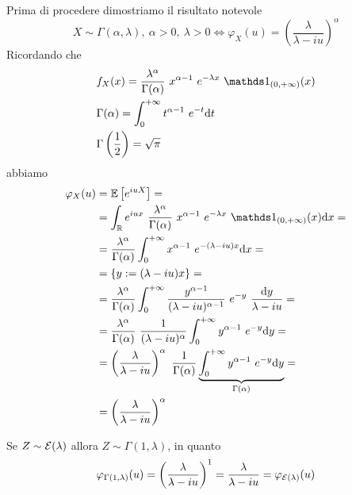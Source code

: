 \Soluzione{} %
Prima di procedere dimostriamo il risultato notevole
\[
X\sim\Gamma(\alpha,\lambda),\ \alpha>0,\ \lambda>0\iff\varphi_X(u)=\left( \frac{\lambda}{\lambda-iu} \right)^\alpha
\]
Ricordando che
\begin{gather*}
\begin{aligned}
&f_X(x)=\frac{\lambda^\alpha}{\Gamma(\alpha)}\ x^{\alpha-1}\ e^{-\lambda x}\ \Ind_{(0,+\infty)}(x) \\
&\Gamma(\alpha)=\int_{0}^{+\infty} t^{\alpha-1}\ e^{-t}\dt \\
&\Gamma\left(\frac{1}{2}\right)=\sqrt{\pi}
\end{aligned}
\end{gather*}
abbiamo
\begin{gather*}
\begin{aligned}
\varphi_X(u)&=\EE\left[e^{iuX}  \right]=\\
&=\int_\RR e^{iux}\ \frac{\lambda^\alpha}{\Gamma(\alpha)}\ x^{\alpha-1}\ e^{-\lambda x}\ \Ind_{(0,+\infty)}(x)\dx=\\
&=\frac{\lambda^\alpha}{\Gamma(\alpha)}\int_{0}^{+\infty} x^{\alpha-1}\ e^{-(\lambda-iu) x}\dx=\\
&=\{ y:=(\lambda-iu)x \}=\\
&=\frac{\lambda^\alpha}{\Gamma(\alpha)}\int_{0}^{+\infty} \frac{y^{\alpha-1}}{(\lambda-iu)^{\alpha-1}}\ e^{-y}\ \frac{\text{d}y}{\lambda-iu}=\\
&=\frac{\lambda^\alpha}{\Gamma(\alpha)}\ \frac{1}{(\lambda-iu)^{\alpha}}\int_{0}^{+\infty} y^{\alpha-1}\ e^{-y}\dy =\\
&=\left(\frac{\lambda}{\lambda-iu}\right)^\alpha\ \frac{1}{\Gamma(\alpha)}\underbrace{\int_{0}^{+\infty} y^{\alpha-1}\ e^{-y}\dy}_{\Gamma(\alpha)}=\\
&=\left(\frac{\lambda}{\lambda-iu}\right)^\alpha
\end{aligned}
\end{gather*}
\begin{oss}
Se $Z\sim\mathcal{E}(\lambda)$ allora $Z\sim\Gamma(1,\lambda)$, in quanto
\[
\varphi_{\Gamma(1,\lambda)}(u)=\left(\frac{\lambda}{\lambda-iu}\right)^1=\frac{\lambda}{\lambda-iu}=\varphi_{\mathcal{E}(\lambda)}(u)
\]
\end{oss}
